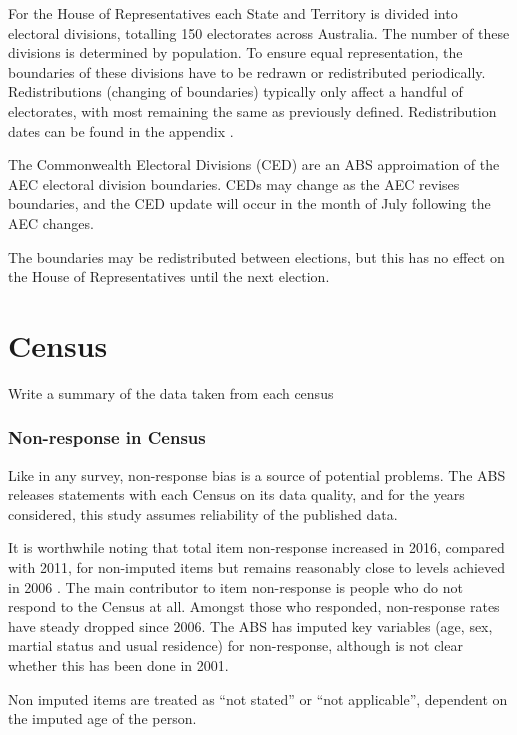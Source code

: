 \documentclass{monashthesis}
\begin{document}
\textcite{AEC-Overview} For the House of Representatives each State and
Territory is divided into electoral divisions, totalling 150 electorates
across Australia. The number of these divisions is determined by
population. To ensure equal representation, the boundaries of these
divisions have to be redrawn or redistributed periodically.
Redistributions (changing of boundaries) typically only affect a handful
of electorates, with most remaining the same as previously defined.
Redistribution dates can be found in the appendix
\textcite{AEC-DistDates}.

\textcite{ABS-CED} The Commonwealth Electoral Divisions (CED) are an ABS
approimation of the AEC electoral division boundaries. CEDs may change
as the AEC revises boundaries, and the CED update will occur in the
month of July following the AEC changes.

The boundaries may be redistributed between elections, but this has no
effect on the House of Representatives until the next election.

\section{Census}\label{census}

Write a summary of the data taken from each census

\subsubsection{Non-response in Census}\label{non-response-in-census}

Like in any survey, non-response bias is a source of potential problems.
The ABS releases statements with each Census on its data quality, and
for the years considered, this study assumes reliability of the
published data.

It is worthwhile noting that total item non-response increased in 2016,
compared with 2011, for non-imputed items but remains reasonably close
to levels achieved in 2006 \textcite{ABS-CQ16}. The main contributor to
item non-response is people who do not respond to the Census at all.
Amongst those who responded, non-response rates have steady dropped
since 2006. The ABS has imputed key variables (age, sex, martial status
and usual residence) for non-response, although is not clear whether
this has been done in 2001.

Non imputed items are treated as ``not stated'' or ``not applicable'',
dependent on the imputed age of the person.
\end{document}
